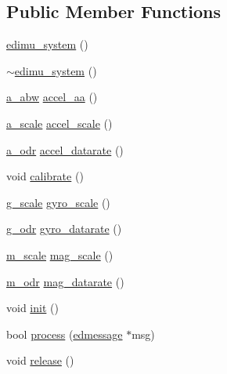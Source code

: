 \subsection*{Public Member Functions}
\begin{DoxyCompactItemize}
\item 
\hyperlink{classedimu__system_a4c17647ced26f28a162520da42f32d13}{edimu\-\_\-system} ()
\item 
\hyperlink{classedimu__system_a382054be9280e8c43e4bc93a05a610c3}{$\sim$edimu\-\_\-system} ()
\item 
\hyperlink{classedimu__system_a94b2ea4b980c77a0156baae05fafa278}{a\-\_\-abw} \hyperlink{classedimu__system_adcec29ff9303db25800cf8026e0c6b37}{accel\-\_\-aa} ()
\item 
\hyperlink{classedimu__system_a61602a34b68df60f8f10c1cd7af37707}{a\-\_\-scale} \hyperlink{classedimu__system_a16ad8b9dbb9a889c2191de9774377882}{accel\-\_\-scale} ()
\item 
\hyperlink{classedimu__system_a4950d1ca91416ce2221f9f251a4ab409}{a\-\_\-odr} \hyperlink{classedimu__system_a5e7fbd97fe33973ec60c1e180b19b797}{accel\-\_\-datarate} ()
\item 
void \hyperlink{classedimu__system_a9ee88f6e0ae602d0037c2f7b0d43f3f8}{calibrate} ()
\item 
\hyperlink{classedimu__system_ac676a08f02fdc00d8e8210985f03e692}{g\-\_\-scale} \hyperlink{classedimu__system_a4f625e2eecfc7a0bb14c7a6195c82771}{gyro\-\_\-scale} ()
\item 
\hyperlink{classedimu__system_aa3293bf451856110ad0b082b9ec0f857}{g\-\_\-odr} \hyperlink{classedimu__system_a2bbaffa196674d42427bc4da6ac8164e}{gyro\-\_\-datarate} ()
\item 
\hyperlink{classedimu__system_ae7dbbcd66d0e16d693ac560884871da3}{m\-\_\-scale} \hyperlink{classedimu__system_ad21c665f25ae14f1da2d46e4274ba6ae}{mag\-\_\-scale} ()
\item 
\hyperlink{classedimu__system_a6912f3ae02645ead8e47b96ebf275b7c}{m\-\_\-odr} \hyperlink{classedimu__system_addc80a5048d987161abd25187f0d449f}{mag\-\_\-datarate} ()
\item 
void \hyperlink{classedimu__system_af745d305e5ff1cfaba3134fd4ff2c342}{init} ()
\item 
bool \hyperlink{classedimu__system_abd6e59b943adbb48fa786f10f809070c}{process} (\hyperlink{structedmessage}{edmessage} $\ast$msg)
\item 
void \hyperlink{classedimu__system_a65927db96dc88e8752f0529d9faa6bc0}{release} ()
\item 

\end{DoxyCompactItemize}
